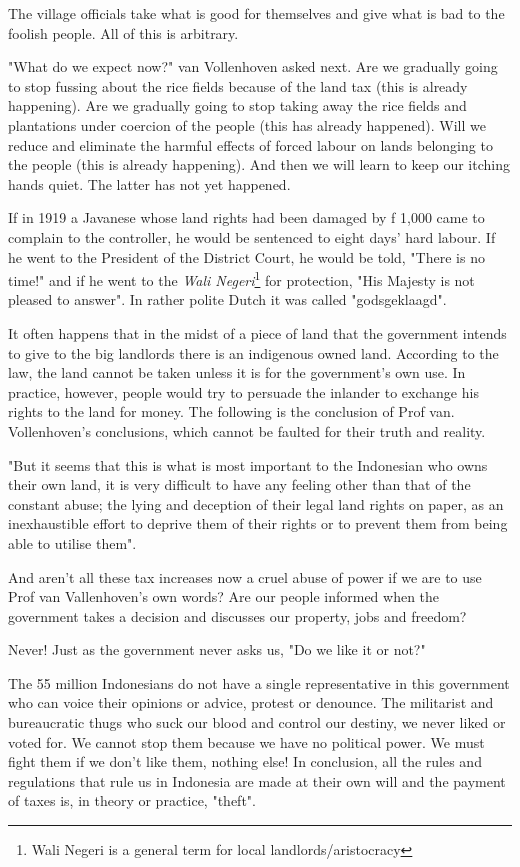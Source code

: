 The village officials take what is good for themselves and give what is bad to the foolish people. All of this is arbitrary.\vskip 0.2in

"What do we expect now?" van Vollenhoven asked next. Are we gradually going to stop 
fussing about the rice fields because of the land tax (this is already happening). 
Are we gradually going to stop taking away the rice fields and plantations under 
coercion of the people (this has already happened). Will we reduce and eliminate 
the harmful effects of forced labour on lands belonging to the people (this is already happening). 
And then we will learn to keep our itching hands quiet. The latter has not yet happened.\vskip 0.2in

If in 1919 a Javanese whose land rights had been damaged by f 1,000 came to complain to 
the controller, he would be sentenced to eight days' hard labour. If he went to the President of 
the District Court, he would be told, "There is no time!" and if he went to the \emph{Wali Negeri}\footnote[6]{Wali Negeri is a general term for local landlords/aristocracy} 
for protection, "His Majesty is not pleased to answer". In rather polite Dutch it was called "godsgeklaagd".

It often happens that in the midst of a piece of land that the government intends 
to give to the big landlords there is an indigenous owned land. According to the law, 
the land cannot be taken unless it is for the government's own use. In practice, 
however, people would try to persuade the inlander to exchange his rights to the land for money.
The following is the conclusion of Prof van. Vollenhoven's conclusions, which cannot be faulted for their truth and reality.\vskip 0.2in

"But it seems that this is what is most important to the Indonesian who owns their own land, 
it is very difficult to have any feeling other than that of the constant abuse; the lying and 
deception of their legal land rights on paper, as an inexhaustible effort to deprive them of 
their rights or to prevent them from being able to utilise them".\vskip 0.2in

And aren't all these tax increases now a cruel abuse of power if 
we are to use Prof van Vallenhoven's own words? Are our people 
informed when the government takes a decision and discusses our property, jobs and freedom?\vskip 0.2in

Never! Just as the government never asks us, "Do we like it or not?"\vskip 0.2in

The 55 million Indonesians do not have a single representative in this government 
who can voice their opinions or advice, protest or denounce. The militarist and 
bureaucratic thugs who suck our blood and control our destiny, we never liked or 
voted for. We cannot stop them because we have no political power. We must fight 
them if we don't like them, nothing else! In conclusion, all the rules and regulations 
that rule us in Indonesia are made at their own will and the payment of taxes is, in theory or practice, "theft".\vskip 0.2in

